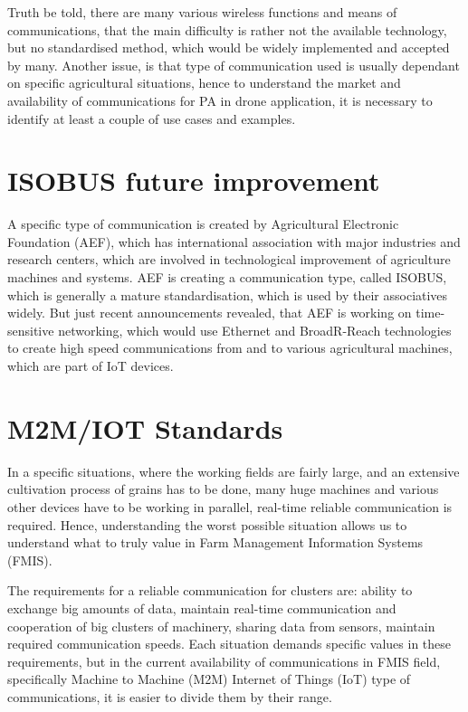 \documentclass[11pt,a4paper,footinclude=true,headinclude=true, oneside]{scrbook}
\begin{document}
Truth be told, there are many various wireless functions and means of communications, that the main difficulty is rather not the available technology, but no standardised method, which would be widely implemented and accepted by many. Another issue, is that type of communication used is usually dependant on specific agricultural situations, hence to understand the market and availability of communications for PA in drone application, it is necessary to identify at least a couple of use cases and examples.

\section{ISOBUS future improvement}

A specific type of communication is created by Agricultural Electronic Foundation (AEF), which has international association with major industries and research centers, which are involved in technological improvement of agriculture machines and systems. AEF is creating a communication type, called ISOBUS, which is generally a mature standardisation, which is used by their associatives widely. But just recent announcements revealed, that AEF is working on time-sensitive networking, which would use Ethernet and BroadR-Reach technologies to create high speed communications from and to various agricultural machines, which are part of IoT devices.

\section{M2M/IOT Standards}

In a specific situations, where the working fields are fairly large, and an extensive cultivation process of grains has to be done, many huge machines and various other devices have to be working in parallel, real-time reliable communication is required. Hence, understanding the worst possible situation allows us to understand what to truly value in Farm Management Information Systems (FMIS).

The requirements for a reliable communication for clusters are: ability to exchange big amounts of data, maintain real-time communication and cooperation of big clusters of machinery, sharing data from sensors, maintain required communication speeds. Each situation demands specific values in these requirements, but in the current availability of communications in FMIS field, specifically Machine to Machine (M2M) Internet of Things (IoT) type of communications, it is easier to divide them by their range.
\end{document}
